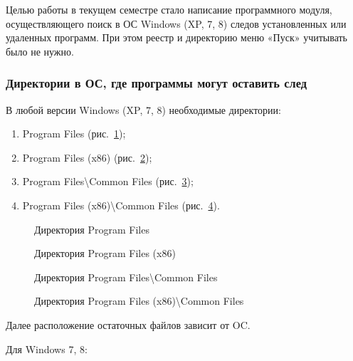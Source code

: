 Целью работы в текущем семестре стало написание программного модуля, осуществляющего поиск в ОС Windows (XP, 7, 8) следов установленных или удаленных программ. При этом реестр и директорию меню «Пуск» учитывать было не нужно.

\subsubsection{Директории в ОС, где программы могут оставить след}

В любой версии Windows (XP, 7, 8) необходимые директории:

\begin{enumerate}
  \item Program Files (рис.~\ref{kucher_1:kucher_1});
  \item Program Files (x86) (рис.~\ref{kucher_2:kucher_2});
  \item Program Files\textbackslash Common Files (рис.~\ref{kucher_3:kucher_3});
  \item Program Files (x86)\textbackslash Common Files (рис.~\ref{kucher_4:kucher_4}).
\end{enumerate}

\begin{figure}[h!]
\caption{Директория Program Files}
\label{kucher_1:kucher_1}
\end{figure} 

\begin{figure}[h!]
\caption{Директория Program Files (x86)}
\label{kucher_2:kucher_2}
\end{figure} 

\begin{figure}[h!]
\caption{Директория Program Files\textbackslash Common Files}
\label{kucher_3:kucher_3}
\end{figure} 

\begin{figure}[h!]
\caption{Директория Program Files (x86)\textbackslash Common Files}
\label{kucher_4:kucher_4}
\end{figure} 


Далее расположение остаточных файлов зависит от OC.


Для Windows 7, 8:


